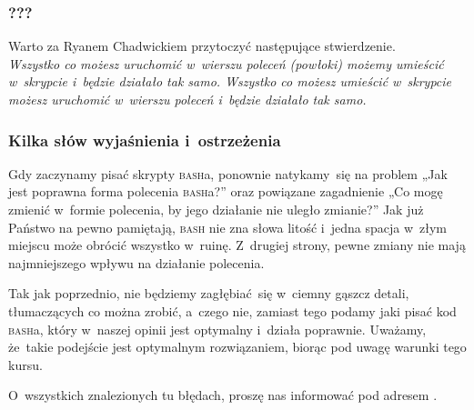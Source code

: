 \documentclass[10pt,t]{beamer}
\begin{document}





\begin{frame}
  \frametitle{???}


  Warto za Ryanem Chadwickiem przytoczyć następujące stwierdzenie. \\
  \textit{Wszystko co możesz uruchomić w~wierszu poleceń (powłoki) możemy
    umieścić w~skrypcie i~będzie działało tak samo. Wszystko co możesz
    umieścić w~skrypcie możesz uruchomić w~wierszu poleceń i~będzie
    działało tak samo.}
  \parencite{Chadwick-BASH-Scripting-Tutorial-Part-I-What-is-ETC-Ver-2025}

\end{frame}





\begin{frame}
  \frametitle{Kilka słów wyjaśnienia i~ostrzeżenia}


  Gdy zaczynamy pisać skrypty \textsc{bash}a, ponownie natykamy~się na
  problem „Jak jest poprawna forma polecenia \textsc{bash}a?” oraz powiązane
  zagadnienie „Co mogę zmienić w~formie polecenia, by jego działanie nie
  uległo zmianie?” Jak już Państwo na pewno pamiętają, \textsc{bash} nie
  zna słowa litość i~jedna spacja w~złym miejscu może obrócić wszystko
  w~ruinę. Z~drugiej strony, pewne zmiany nie mają najmniejszego wpływu
  na działanie polecenia.

  Tak jak poprzednio, nie będziemy zagłębiać~się w~ciemny gąszcz detali,
  tłumaczących co można zrobić, a~czego nie, zamiast tego podamy jaki
  pisać kod \textsc{bash}a, który w~naszej opinii jest optymalny
  i~działa poprawnie. Uważamy, że~takie podejście jest optymalnym
  rozwiązaniem, biorąc pod uwagę warunki tego kursu.

  O~wszystkich znalezionych tu błędach, proszę nas informować pod adresem
  \email.

\end{frame}
















\end{document}
